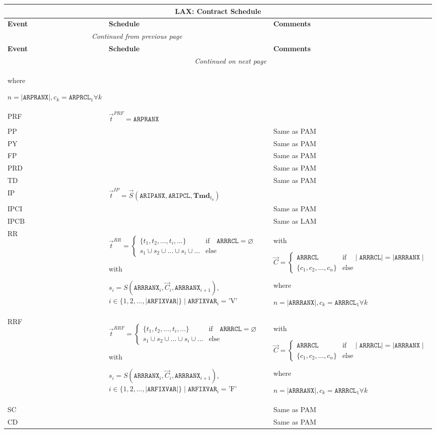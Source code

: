 \documentclass[9pt,oneside]{amsart}
\newenvironment{schedule}[1]{
	\hfill %
	\begin{longtable}{| p{0.05\textwidth} | p{0.5\textwidth} |  p{0.4\textwidth} |}
	\multicolumn{3}{c}{\textbf{#1: Contract Schedule}}\\
	\hline
	\textbf{Event} & \textbf{Schedule} & \textbf{Comments} \\
	\hline
	\endfirsthead
	\multicolumn{2}{c}{\textit{Continued from previous page}} \\
	\hline
	\textbf{Event} & \textbf{Schedule} & \textbf{Comments} \\
	\hline
	\endhead
	\hline \multicolumn{2}{r}{\textit{Continued on next page}} \\
	\endfoot
	\endlastfoot
}{%
	\hline
	\end{longtable}
}
\newcommand{\svar}[2]{\textbf{#1}_{#2}}
\newcommand{\attr}[1]{\texttt{#1}}
\newcommand{\sdl}[3]{S(#1,#2,#3)}
\newcommand{\vsdl}[3]{\vec{S}(#1,#2,#3)}
\newcommand{\undef}{\varnothing}
\begin{document}
\begin{schedule}{LAX}
			where\par
			$n=\mid\attr{ARPRANX}\mid, c_k=\attr{ARPRCL}_1\forall k$ \\
	\hline
	PRF & $\vec{t}^{PRF} = \attr{ARPRANX}$ & \\
	\hline
	PP & & Same as PAM \\
	\hline
	PY & & Same as PAM \\
	\hline
	FP & & Same as PAM \\
	\hline
	PRD & & Same as PAM \\
	\hline
	TD & & Same as PAM \\
	\hline
	IP & $\vec{t}^{IP} = \vsdl{\attr{ARIPANX}}{\attr{ARIPCL}}{\svar{Tmd}{t_0}}$ & \\
	\hline
	IPCI & & Same as PAM \\
  	\hline
	IPCB & & Same as LAM \\
	\hline
	RR & $\vec{t}^{RR} = \begin{cases} \{ t_1, t_2, ..., t_i, ... \} & \text{if}\quad \attr{ARRRCL}=\undef \\
					s_1 \cup s_2 \cup ... \cup s_i \cup ... & \text{else} \end{cases}$ \par
		with\par
		$s_i=\sdl{\attr{ARRRANX}_i}{\vec{C}_i}{\attr{ARRRANX}_{i+1}}$, $i\in\{1,2,...,\mid\attr{ARFIXVAR}\mid\} \mid \attr{ARFIXVAR}_i = \text{'V'}$
		& with\par $\vec{C} = \begin{cases} \attr{ARRRCL} & \text{if} \quad \mid\attr{ARRRCL}\mid = \mid \attr{ARRRANX}\mid \\
				   \{ c_1, c_2, ..., c_n \}  & \text{else} \end{cases}$ \par
			where\par
			$n=\mid\attr{ARRRANX}\mid, c_k=\attr{ARRRCL}_1\forall k$ \\
	\hline
	RRF & $\vec{t}^{RRF} = \begin{cases} \{ t_1, t_2, ..., t_i, ... \} & \text{if}\quad \attr{ARRRCL}=\undef \\
					s_1 \cup s_2 \cup ... \cup s_i \cup ... & \text{else} \end{cases}$ \par
		with\par
		$s_i=\sdl{\attr{ARRRANX}_i}{\vec{C}_i}{\attr{ARRRANX}_{i+1}}$, $i\in\{1,2,...,\mid\attr{ARFIXVAR}\mid\} \mid \attr{ARFIXVAR}_i = \text{'F'}$
		& with\par $\vec{C} = \begin{cases} \attr{ARRRCL} & \text{if} \quad \mid\attr{ARRRCL}\mid = \mid \attr{ARRRANX}\mid \\
				   \{ c_1, c_2, ..., c_n \}  & \text{else} \end{cases}$ \par
			where\par
			$n=\mid\attr{ARRRANX}\mid, c_k=\attr{ARRRCL}_1\forall k$ \\
	\hline
	SC & & Same as PAM \\
	\hline
	CD & & Same as PAM \\
\end{schedule}
\end{document}
